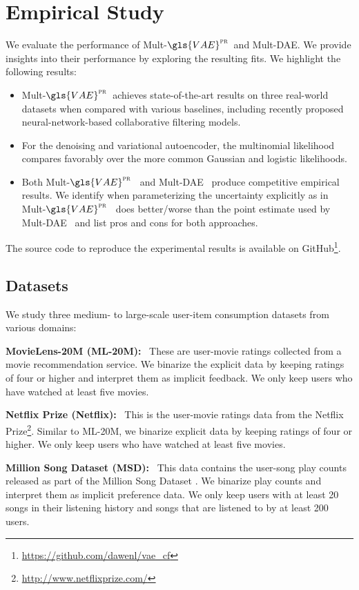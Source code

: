 \documentclass[sigconf]{acmart}
\DeclareRobustCommand{\parhead}[1]{\textbf{#1}~}
\newcommand{\mvae}{{\small Mult-}$\gls{VAE}^{\text{\sc pr}}$}
\newcommand{\mdae}{{\small Mult-}\gls{DAE}}
\begin{document}
\section{Empirical Study} \label{sec:exp}

We evaluate the performance of \mvae~and \mdae. We provide insights into their performance by exploring the resulting fits. We highlight the following results:  
\begin{itemize}
	\item \mvae~achieves state-of-the-art results on three real-world datasets when compared with various baselines, including recently proposed neural-network-based collaborative filtering models. 
	\item For the denoising and variational autoencoder, the multinomial likelihood compares favorably over the more common Gaussian and logistic likelihoods. 
	\item Both \mvae~ and \mdae~ produce competitive empirical results. We identify when parameterizing the uncertainty explicitly as in \mvae~ does better/worse than the point estimate used by \mdae~ and list pros and cons for both approaches.
\end{itemize}

The source code to reproduce the experimental results is available on GitHub\footnote{\url{https://github.com/dawenl/vae_cf}}. 

\subsection{Datasets} \label{sec:exp_data}

We study three medium- to large-scale user-item consumption
datasets from various domains: 

\parhead{MovieLens-20M (ML-20M):} These are user-movie ratings collected
from a movie recommendation service. We binarize the
explicit data by keeping ratings of four or higher and
interpret them as implicit feedback. We only keep users who
have watched at least five movies.

\parhead{Netflix Prize (Netflix):} This is the user-movie ratings data from the Netflix Prize\footnote{\url{http://www.netflixprize.com/}}. Similar to ML-20M, we binarize explicit data by keeping ratings of four or higher. We only keep users who have watched at least five movies. 

\parhead{Million Song Dataset (MSD):} This data contains the user-song play counts released as part of the Million Song Dataset \citep{bertin2011million}. We binarize play
counts and interpret them as implicit preference data. We only
keep users with at least 20 songs in their listening history
and songs that are listened to by at least 200 users.
\end{document}
